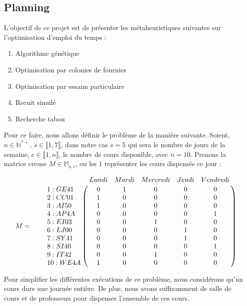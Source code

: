 

\subsection{Planning}

L'objectif de ce projet est de présenter les métaheuristiques suivantes sur l'optimisation d'emploi du temps :
\begin{enumerate}
    \item Algorithme génétique
    \item Optimisation par colonies de fournies
    \item Optimisation par essaim particulaire
    \item Recuit simulé
    \item Recherche tabou
\end{enumerate}

Pour ce faire, nous allons définir le problème de la manière suivante.
Soient, $n \in \mathbb{N}^{*+}$, $s \in \llbracket 1 ,7 \rrbracket$, dans notre cas $s = 5$ qui sera le nombre de jours de la semaine, $c \in \llbracket 1 ,n \rrbracket$, le nombre de cours disponible, avec $n = 10 $.
Prenons la matrice creuse $M \in \mathbb{M}_{s,c}$, ou les $1$ représenter les cours dispensés ce jour :

\[
    M = \qquad \bordermatrix{~  & \tikzmark{harrowleft} Lundi & Mardi & Mercredi & Jeudi
    & Vendredi\tikzmark{harrowright}  \cr
    \tikzmark{varrowtop}
    1 : GE41 & 0 & 1 & 0 & 0 & 0 \cr
    2 : CC01 & 1 & 0 & 0 & 0 & 0 \cr
    3 : AI50 & 1 & 0 & 0 & 0 & 0 \cr
    4 : AP4A & 0 & 0 & 0 & 0 & 1 \cr
    5 : EI03 & 0 & 0 & 1 & 0 & 0 \cr
    6 : LJ00 & 0 & 0 & 0 & 1 & 0 \cr
    7 : SY41 & 0 & 0 & 0 & 1 & 0 \cr
    8 : SI40 & 0 & 0 & 0 & 0 & 1 \cr
    9 : IT42 & 0 & 0 & 1 & 0 & 0 \cr
    \tikzmark{varrowbottom} 10 : WE4A & 1 & 0 & 0 & 0 & 0 \cr
    }
\]

Pour simplifier les différentes exécutions de ce problème, nous considérons qu'un cours dure une journée entière.
De plus, nous avons suffisamment de salle de cours et de professeurs pour dispenser l'ensemble de ces cours.


